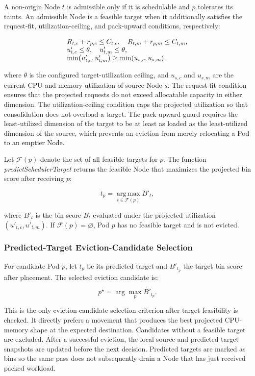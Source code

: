 A non-origin Node \(t\) is admissible only if it is schedulable and \(p\) tolerates its taints. An admissible Node is a feasible target when it additionally satisfies the request-fit, utilization-ceiling, and pack-upward conditions, respectively:

\[
\begin{array}{@{}l@{}}
    R_{t,c} + r_{p,c} \leq C_{t,c},\quad
    R_{t,m} + r_{p,m} \leq C_{t,m},\\
    u'_{t,c} \leq \theta,\quad
    u'_{t,m} \leq \theta,\\
    \min\!\left(u'_{t,c}, u'_{t,m}\right)
    \geq \min\!\left(u_{s,c}, u_{s,m}\right).
\end{array}
\]

where \(\theta\) is the configured target-utilization ceiling, and \(u_{s,c}\) and \(u_{s,m}\) are the current CPU and memory utilization of source Node \(s\). The request-fit condition ensures that the projected requests do not exceed allocatable capacity in either dimension. The utilization-ceiling condition caps the projected utilization so that consolidation does not overload a target. The pack-upward guard requires the least-utilized dimension of the target to be at least as loaded as the least-utilized dimension of the source, which prevents an eviction from merely relocating a Pod to an emptier Node.

Let \(\mathcal{F}(p)\) denote the set of all feasible targets for \(p\). The function \textit{predictSchedulerTarget} returns the feasible Node that maximizes the projected bin score after receiving \(p\):

\[
    t_p = \operatorname*{arg\,max}_{t \in \mathcal{F}(p)} B'_t,
\]

where \(B'_t\) is the bin score \(B_t\) evaluated under the projected utilization \(\left(u'_{t,c}, u'_{t,m}\right)\). If \(\mathcal{F}(p) = \varnothing\), Pod \(p\) has no feasible target and is not evicted.

\subsubsection{Predicted-Target Eviction-Candidate Selection}
\label{sec:defrag_victim_selection}

For candidate Pod \(p\), let \(t_p\) be its predicted target and \(B'_{t_p}\) the target bin score after placement. The selected eviction candidate is:

\[
    p^\star = \arg\max_{p} B'_{t_p}.
\]

This is the only eviction-candidate selection criterion after target feasibility is checked. It directly prefers a movement that produces the best projected CPU-memory shape at the expected destination. Candidates without a feasible target are excluded. After a successful eviction, the local source and predicted-target snapshots are updated before the next decision. Predicted targets are marked as bins so the same pass does not subsequently drain a Node that has just received packed workload.

